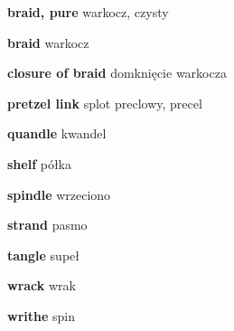 \item \textbf{braid, pure} warkocz, czysty
\item \textbf{braid} warkocz
\item \textbf{closure of braid} domknięcie warkocza
\item \textbf{pretzel link} splot preclowy, precel
\item \textbf{quandle} kwandel
\item \textbf{shelf} półka
\item \textbf{spindle} wrzeciono
\item \textbf{strand} pasmo
\item \textbf{tangle} supeł
\item \textbf{wrack} wrak
\item \textbf{writhe} spin
